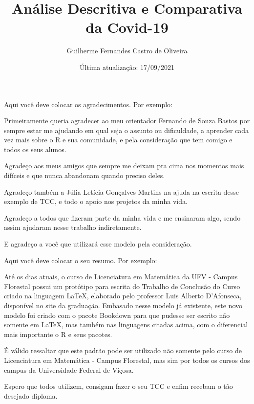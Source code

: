 \documentclass[
  fleqn,ebook]{ic}
\title{Análise Descritiva e Comparativa da Covid-19}
\author{Guilherme Fernandes Castro de Oliveira}
\date{Última atualização: 17/09/2021}
\renewcommand\maketitle{}
\begin{document}
\maketitle

\begin{acknowledgement}

  Aqui você deve colocar os agradecimentos. Por exemplo:
  
  Primeiramente queria agradecer ao meu orientador Fernando de Souza Bastos por
  sempre estar me ajudando em qual seja o assunto ou dificuldade, a aprender
  cada vez mais sobre o R e sua comunidade, e pela consideração que tem comigo e
  todos os seus alunos.
  
  Agradeço aos meus amigos que sempre me deixam pra cima nos momentos mais
  difíceis e que nunca abandonam quando preciso deles.

  Agradeço também a Júlia Letícia Gonçalves Martins na ajuda na escrita desse
  exemplo de TCC, e todo o apoio nos projetos da minha vida.
  
  Agradeço a todos que fizeram parte da minha vida e me ensinaram algo, sendo
  assim ajudaram nesse trabalho indiretamente.
  
  E agradeço a você que utilizará esse modelo pela consideração.

\end{acknowledgement}
\begin{Resumo}
  
  Aqui você deve colocar o seu resumo. Por exemplo:
  
  Até os dias atuais, o curso de Licenciatura em Matemática da UFV - Campus 
  Florestal possui um protótipo para escrita do Trabalho de Conclusão do Curso
  criado na linguagem LaTeX, elaborado pelo professor Luis Alberto D'Afonseca, 
  disponível no site da graduação. Embasado nesse modelo já existente, este novo
  modelo foi criado com o pacote Bookdown para que pudesse ser escrito não 
  somente em LaTeX, mas também nas linguagens citadas acima, com o diferencial 
  mais importante o R e seus pacotes.
  
  É válido ressaltar que este padrão pode ser utilizado não somente pelo curso
  de Licenciatura em Matemática - Campus Florestal, mas sim por todos os cursos
  dos campus da Universidade Federal de Viçosa.
  
  Espero que todos utilizem, consigam fazer o seu TCC e enfim recebam o tão
  desejado diploma.
  
\end{Resumo}
\end{document}
